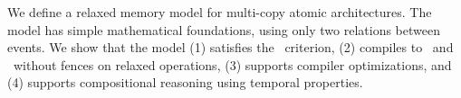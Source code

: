 We define a relaxed memory model for multi-copy atomic architectures.  The
model has simple mathematical foundations, using only two relations between
events.  We show that the model (1) satisfies the \drfsc\ criterion, (2)
compiles to \tso\ and \armeight\ without fences on relaxed operations, (3)
supports compiler optimizations, and (4) supports compositional reasoning
using temporal properties.
